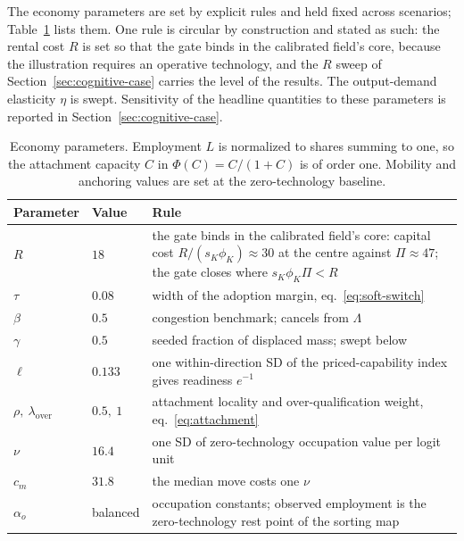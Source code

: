 \documentclass[12pt, a4paper]{article}
\begin{document}
The economy parameters are set by explicit rules and held fixed across
scenarios; Table~\ref{tab:economy-parameters} lists them. One rule is
circular by construction and stated as such: the rental cost $R$ is set
so that the gate binds in the calibrated field's core, because the
illustration requires an operative technology, and the $R$ sweep of
Section~\ref{sec:cognitive-case} carries the level of the results. The
output-demand elasticity $\eta$ is swept. Sensitivity of the headline
quantities to these parameters is reported in
Section~\ref{sec:cognitive-case}.

\begin{table}[!htbp]
\centering
\caption{Economy parameters. Employment $L$ is normalized to shares
summing to one, so the attachment capacity $C$ in $\Phi(C)=C/(1+C)$ is
of order one. Mobility and anchoring values are set at the
zero-technology baseline.}
\label{tab:economy-parameters}
\begin{tabular}{ll>{\raggedright\arraybackslash}p{8.2cm}}
\toprule
Parameter & Value & Rule \\
\midrule
$R$ & $18$ & the gate binds in the calibrated field's core: capital
cost $R/(s_K\phi_K)\approx30$ at the centre against $\Pi\approx47$;
the gate closes where $s_K\phi_K\Pi<R$ \\
$\tau$ & $0.08$ & width of the adoption margin, eq.~\eqref{eq:soft-switch} \\
$\beta$ & $0.5$ & congestion benchmark; cancels from $\Lambda$ \\
$\gamma$ & $0.5$ & seeded fraction of displaced mass; swept below \\
$\ell$ & $0.133$ & one within-direction SD of the priced-capability
index gives readiness $e^{-1}$ \\
$\rho,\ \lambda_{\mathrm{over}}$ & $0.5,\ 1$ & attachment locality and
over-qualification weight, eq.~\eqref{eq:attachment} \\
$\nu$ & $16.4$ & one SD of zero-technology occupation value per logit unit \\
$c_m$ & $31.8$ & the median move costs one $\nu$ \\
$\alpha_o$ & balanced & occupation constants; observed employment is the
zero-technology rest point of the sorting map \\
\bottomrule
\end{tabular}
\end{table}
\end{document}
